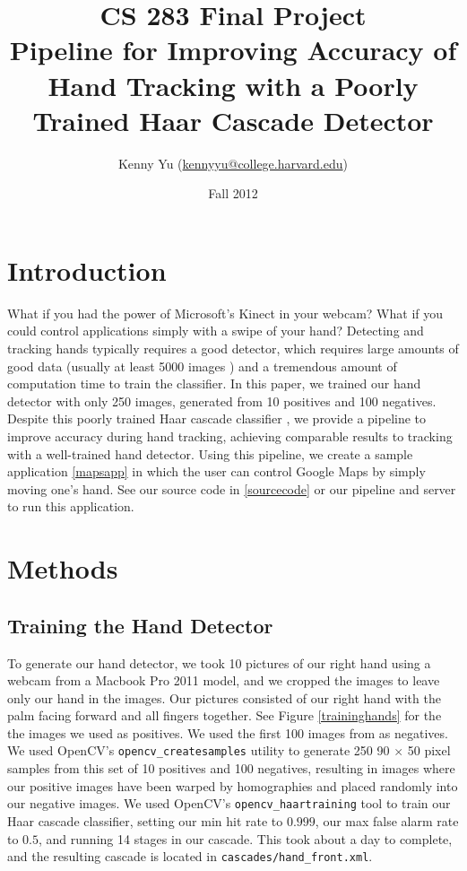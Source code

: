 \documentclass[12pt]{article}
\begin{document}
\title{CS 283 Final Project \\ Pipeline for Improving Accuracy of Hand Tracking with a Poorly Trained Haar Cascade Detector}
\date{Fall 2012}
\author{Kenny Yu (\href{mailto:kennyyu@college.harvard.edu}{kennyyu@college.harvard.edu})}
\maketitle

\section{Introduction}
What if you had the power of Microsoft's Kinect in your webcam? What if you could control applications simply with a swipe of your hand? Detecting and tracking hands typically requires a good detector, which requires large amounts of good data (usually at least 5000 images \cite{cascadetutorial}) and a tremendous amount of computation time to train the classifier. In this paper, we trained our hand detector with only 250 images, generated from 10 positives and 100 negatives. Despite this poorly trained Haar cascade classifier \cite{violajones}, we provide a pipeline to improve accuracy during hand tracking, achieving comparable results to tracking with a well-trained hand detector. Using this pipeline, we create a sample application \ref{mapsapp} in which the user can control Google Maps \cite{googlemaps} by simply moving one's hand. See our source code in \ref{sourcecode} or our pipeline and server to run this application.

\section{Methods}

\subsection{Training the Hand Detector}
To generate our hand detector, we took 10 pictures of our right hand using a webcam from a  Macbook Pro 2011 model, and we cropped the images to leave only our hand in the images. Our pictures consisted of our right hand with the palm facing forward and all fingers together. See Figure \ref{traininghands} for the the images we used as positives. We used the first 100 images from \cite{negatives} as negatives. We used OpenCV's \texttt{opencv\_createsamples} \cite{cascadetutorial}utility to generate 250 90 $\times$ 50 pixel samples from this set of 10 positives and 100 negatives, resulting in images where our positive images have been warped by homographies and placed randomly into our negative images. We used OpenCV's \texttt{opencv\_haartraining} tool to train our Haar cascade classifier, setting our min hit rate to $0.999$, our max false alarm rate to $0.5$, and running 14 stages in our cascade. This took about a day to complete, and the resulting cascade is located in \texttt{cascades/hand\_front.xml}.
\end{document}
